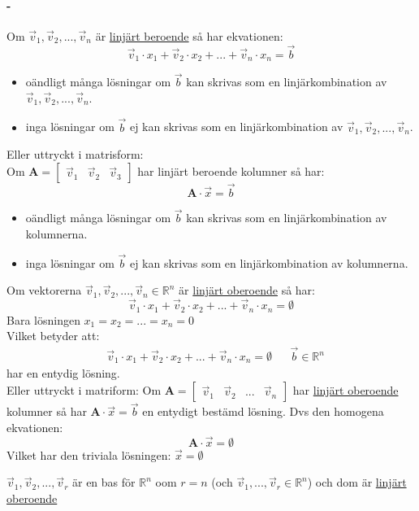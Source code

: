 \paragraph{-} %
\label{par:_1}
Om $\vec{v}_1, \vec{v}_2,..., \vec{v}_n$ är \underline{linjärt beroende} så har ekvationen:
\[
\vec{v}_1 \cdot x_1 + \vec{v}_2 \cdot x_2 + ... + \vec{v}_n \cdot x_n = \vec{b}
\]
\begin{itemize}
	\item oändligt många lösningar om $\vec{b}$ kan skrivas som en linjärkombination av $\vec{v}_1, \vec{v}_2,..., \vec{v}_n$.
	\item inga lösningar om $\vec{b}$ ej kan skrivas som en linjärkombination av $\vec{v}_1, \vec{v}_2,..., \vec{v}_n$.
\end{itemize}
Eller uttryckt i matrisform:\\
Om $\mathbf{A} = \begin{bmatrix} \vec{v}_1&\vec{v}_2&\vec{v}_3 \end{bmatrix}$ har linjärt beroende kolumner så har:
\[
\mathbf{A} \cdot \vec{x} = \vec{b}
\]
\begin{itemize}
	\item oändligt många lösningar om $\vec{b}$ kan skrivas som en linjärkombination av kolumnerna.
	\item inga lösningar om $\vec{b}$ ej kan skrivas som en linjärkombination av kolumnerna.
\end{itemize}
Om vektorerna $\vec{v}_1, \vec{v}_2,..., \vec{v}_n \in \mathbb{R}^n$ är \underline{linjärt oberoende} så har:
\[
\vec{v}_1 \cdot x_1 + \vec{v}_2 \cdot x_2 +...+ \vec{v}_n \cdot x_n = \emptyset
\]
Bara lösningen $x_1 = x_2 = ... = x_n = 0$\\
Vilket betyder att:
\begin{align*}
&\vec{v}_1 \cdot x_1 + \vec{v}_2 \cdot x_2 +...+ \vec{v}_n \cdot x_n = \emptyset
&&\vec{b} \in \mathbb{R}^n
\end{align*}
har en entydig lösning.\\
Eller uttryckt i matriform:
Om $\mathbf{A} = \begin{bmatrix} \vec{v}_1 & \vec{v}_2 &...&\vec{v}_n \end{bmatrix}$ har \underline{linjärt oberoende} kolumner så har $\mathbf{A} \cdot \vec{x} = \vec{b}$ en entydigt bestämd lösning. Dvs den homogena ekvationen:
\[
\mathbf{A} \cdot \vec{x} = \emptyset
\]
Vilket har den triviala lösningen: $\vec{x} = \emptyset$
\begin{sats}
	$\vec{v}_1, \vec{v}_2,..., \vec{v}_r$ är en bas för $\mathbb{R}^n$ oom $r = n$ (och $\vec{v}_1,..., \vec{v}_r \in \mathbb{R}^n$) och dom är \underline{linjärt oberoende}
\end{sats}
